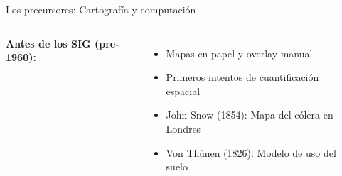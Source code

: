 \documentclass[10pt]{beamer}
\begin{document}
\begin{frame}{Los precursores: Cartografía y computación}
    \begin{columns}
        \textbf{Antes de los SIG (pre-1960):}
        \begin{itemize}
            \item Mapas en papel y overlay manual
            \item Primeros intentos de cuantificación espacial
            \item John Snow (1854): Mapa del cólera en Londres
            \item Von Thünen (1826): Modelo de uso del suelo
        \end{itemize}
        
        \begin{center}
        \end{center}
    \end{columns}
\end{frame}
\end{document}
